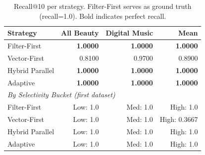 \begin{table}[ht]
\centering
\small
\begin{tabular}{lrrr}
\hline
Strategy & All Beauty & Digital Music & Mean \\
\hline
Filter-First & \textbf{1.0000} & \textbf{1.0000} & \textbf{1.0000} \\
Vector-First & 0.8100 & 0.9700 & 0.8900 \\
Hybrid Parallel & \textbf{1.0000} & \textbf{1.0000} & \textbf{1.0000} \\
Adaptive & \textbf{1.0000} & \textbf{1.0000} & \textbf{1.0000} \\
\hline
\multicolumn{4}{l}{\textit{By Selectivity Bucket (first dataset)}} \\
\hline
Filter-First & Low: 1.0 & Med: 1.0 & High: 1.0 \\
Vector-First & Low: 1.0 & Med: 1.0 & High: 0.3667 \\
Hybrid Parallel & Low: 1.0 & Med: 1.0 & High: 1.0 \\
Adaptive & Low: 1.0 & Med: 1.0 & High: 1.0 \\
\hline
\end{tabular}
\caption{Recall@10 per strategy. Filter-First serves as ground truth (recall=1.0). Bold indicates perfect recall.}
\label{tab:recall-at-10}
\end{table}